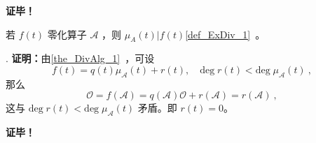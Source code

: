 \textbf{证毕！}
\begin{theorem}{}
若 $f(t)$ 零化算子 $\mathcal A$ ，则 $\mu_{A}(t)|f(t)$\autoref{def_ExDiv_1}~。
\end{theorem}.
\textbf{证明：}由\autoref{the_DivAlg_1}~，可设 
\begin{equation}
f(t)=q(t)\mu_\mathcal{A}(t)+r(t),\quad\mathrm{deg}\;r(t)<\mathrm{deg}\;\mu_{\mathcal{A}}(t)~,
\end{equation}
那么
\begin{equation}
\mathcal O=f(\mathcal A)=q(\mathcal A)\mathcal O+r(\mathcal A)=r(\mathcal A)~,
\end{equation}
这与 $\mathrm{deg}\;r(t)<\mathrm{deg}\;\mu_{\mathcal A}(t)$ 矛盾。即 $r(t)=0$。

\textbf{证毕！}

